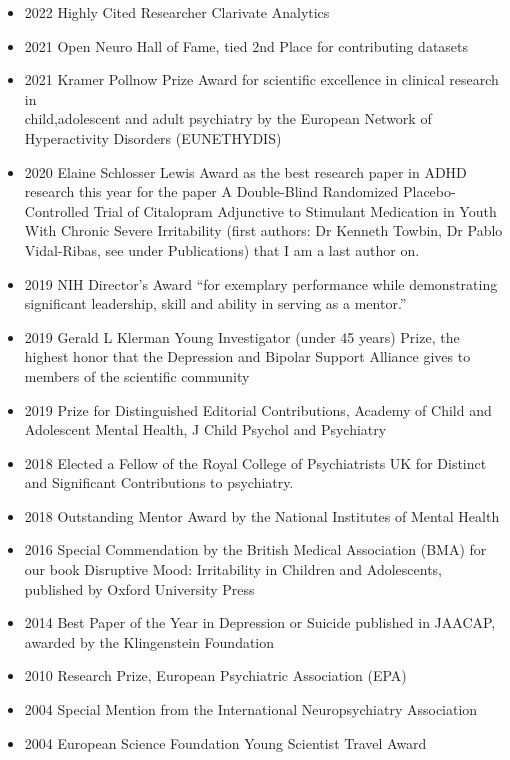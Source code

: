 \documentclass[
]{article}
\providecommand{\tightlist}{%
  \setlength{\itemsep}{0pt}\setlength{\parskip}{0pt}}
\begin{document}
\begin{itemize}
\tightlist
\item
  2022 Highly Cited Researcher Clarivate Analytics
\item
  2021 Open Neuro Hall of Fame, tied 2nd Place for contributing datasets
\item
  2021 Kramer Pollnow Prize Award for scientific excellence in clinical
  research in\\
  child,adolescent and adult psychiatry by the European Network of
  Hyperactivity Disorders (EUNETHYDIS)
\item
  2020 Elaine Schlosser Lewis Award as the best research paper in ADHD
  research this year for the paper A Double-Blind Randomized
  Placebo-Controlled Trial of Citalopram Adjunctive to Stimulant
  Medication in Youth With Chronic Severe Irritability (first authors:
  Dr Kenneth Towbin, Dr Pablo Vidal-Ribas, see under Publications) that
  I am a last author on.
\item
  2019 NIH Director's Award ``for exemplary performance while
  demonstrating significant leadership, skill and ability in serving as
  a mentor.''\\
\item
  2019 Gerald L Klerman Young Investigator (under 45 years) Prize, the
  highest honor that the Depression and Bipolar Support Alliance gives
  to members of the scientific community
\item
  2019 Prize for Distinguished Editorial Contributions, Academy of Child
  and Adolescent Mental Health, J Child Psychol and Psychiatry
\item
  2018 Elected a Fellow of the Royal College of Psychiatrists UK for
  Distinct and Significant Contributions to psychiatry.
\item
  2018 Outstanding Mentor Award by the National Institutes of Mental
  Health
\item
  2016 Special Commendation by the British Medical Association (BMA) for
  our book Disruptive Mood: Irritability in Children and Adolescents,
  published by Oxford University Press
\item
  2014 Best Paper of the Year in Depression or Suicide published in
  JAACAP, awarded by the Klingenstein Foundation
\item
  2010 Research Prize, European Psychiatric Association (EPA)\\
\item
  2004 Special Mention from the International Neuropsychiatry
  Association
\item
  2004 European Science Foundation Young Scientist Travel Award
\end{itemize}
\end{document}
